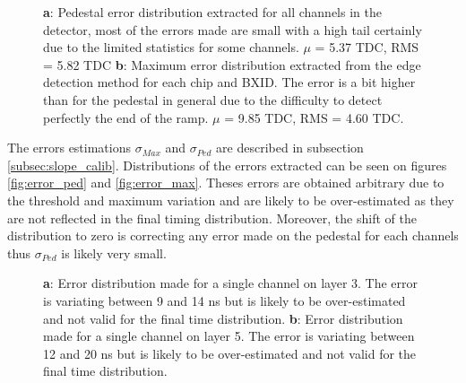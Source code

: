 \documentclass[twoside,a4paper,11pt]{article}
\begin{document}
\begin{appendix}
\begin{figure}[htbp]
	\caption[]{\textbf{a}: Pedestal error distribution extracted for all channels in the detector, most of the errors made are small with a high tail certainly due to the limited statistics for some channels. $\mu$ = 5.37 TDC, RMS = 5.82 TDC \textbf{b}: Maximum error distribution extracted from the edge detection method for each chip and BXID. The error is a bit higher than for the pedestal in general due to the difficulty to detect perfectly the end of the ramp. $\mu$ = 9.85 TDC, RMS = 4.60 TDC.}
	\label{fig:error_dist}
\end{figure}
The errors estimations $\sigma_{Max}$ and $\sigma_{Ped}$ are described in subsection \ref{subsec:slope_calib}. Distributions of the errors extracted can be seen on figures \ref{fig:error_ped} and \ref{fig:error_max}. Theses errors are obtained arbitrary due to the threshold and maximum variation and are likely to be over-estimated as they are not reflected in the final timing distribution. Moreover, the shift of the distribution to zero is correcting any error made on the pedestal for each channels thus $\sigma_{Ped}$ is likely very small. 
\begin{figure}[htbp]
	\hfill
	\caption[]{\textbf{a}: Error distribution made for a single channel on layer 3. The error is variating between 9 and 14 ns but is likely to be over-estimated and not valid for the final time distribution. \textbf{b}: Error distribution made for a single channel on layer 5. The error is variating between 12 and 20 ns but is likely to be over-estimated and not valid for the final time distribution.}

\end{figure}
\end{appendix}
\end{document}
